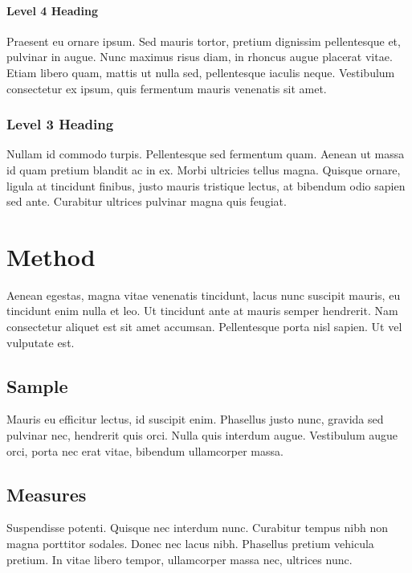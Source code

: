 \documentclass[a4paper,12pt,stu,donotrepeattitle,floatsintext,twoside]{apa7}
\begin{document}
\paragraph{Level 4 Heading}

Praesent eu ornare ipsum. Sed mauris tortor, pretium dignissim pellentesque et, pulvinar in augue. Nunc maximus risus diam, in rhoncus augue placerat vitae. Etiam libero quam, mattis ut nulla sed, pellentesque iaculis neque. Vestibulum consectetur ex ipsum, quis fermentum mauris venenatis sit amet.

\subsubsection{Level 3 Heading}

Nullam id commodo turpis. Pellentesque sed fermentum quam. Aenean ut massa id quam pretium blandit ac in ex. Morbi ultricies tellus magna. Quisque ornare, ligula at tincidunt finibus, justo mauris tristique lectus, at bibendum odio sapien sed ante. Curabitur ultrices pulvinar magna quis feugiat.


\section{Method}\label{sec:Method}

Aenean egestas, magna vitae venenatis tincidunt, lacus nunc suscipit mauris, eu tincidunt enim nulla et leo. Ut tincidunt ante at mauris semper hendrerit. Nam consectetur aliquet est sit amet accumsan. Pellentesque porta nisl sapien. Ut vel vulputate est.

\subsection{Sample}

Mauris eu efficitur lectus, id suscipit enim. Phasellus justo nunc, gravida sed pulvinar nec, hendrerit quis orci. Nulla quis interdum augue. Vestibulum augue orci, porta nec erat vitae, bibendum ullamcorper massa.

\subsection{Measures}

Suspendisse potenti. Quisque nec interdum nunc. Curabitur tempus nibh non magna porttitor sodales. Donec nec lacus nibh. Phasellus pretium vehicula pretium. In vitae libero tempor, ullamcorper massa nec, ultrices nunc.
\end{document}
